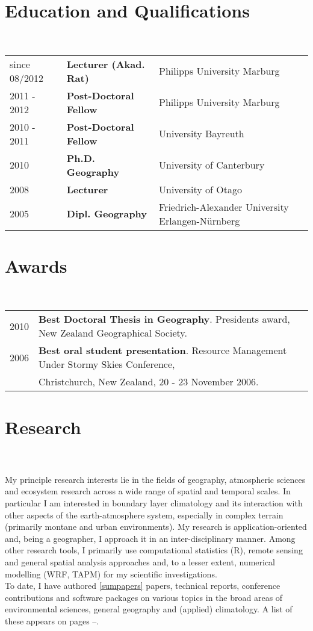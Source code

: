 \documentclass[a4paper,11pt]{article}
\begin{document}
\maketitle
\section{Education and Qualifications}
\hrulefill \\
\begin{tabular}{lll}\\
since 08/2012 & \textbf{Lecturer (Akad. Rat)} & Philipps University Marburg\\
2011 - 2012 & \textbf{Post-Doctoral Fellow} & Philipps University Marburg\\
2010 - 2011 & \textbf{Post-Doctoral Fellow} & University Bayreuth\\
2010 & \textbf{Ph.D. Geography} & University of Canterbury\\
2008 & \textbf{Lecturer} & University of Otago\\
2005 & \textbf{Dipl. Geography} & Friedrich-Alexander University Erlangen-N\"urnberg
\end{tabular}

\section{Awards}
\hrulefill \\
\begin{tabular}{lll}\\
2010 & \textbf{Best Doctoral Thesis in Geography}. Presidents award, New Zealand Geographical Society.\\
2006 & \textbf{Best oral student presentation}. Resource Management Under Stormy Skies Conference, \\
	 & Christchurch, New Zealand, 20 - 23 November 2006.
\end{tabular}

\section{Research}
\hrulefill \\
\hfill \\
My principle research interests lie in the fields of geography, atmospheric sciences and ecosystem research across a wide range of spatial and temporal scales. In particular I am interested in boundary layer climatology and its interaction with other aspects of the earth-atmosphere system, especially in complex terrain (primarily montane and urban environments). My research is application-oriented and, being a geographer, I approach it in an inter-disciplinary manner. Among other research tools, I primarily use computational statistics (R), remote sensing and general spatial analysis approaches and, to a lesser extent, numerical modelling (WRF, TAPM) for my scientific investigations.\\
To date, I have authored \ref{sumpapers} papers, technical reports, conference contributions and software packages on various topics in the broad areas of environmental sciences, general geography and (applied) climatology. A list of these appears on pages \pageref{papersstart}--\pageref{papersend}.
\end{document}
